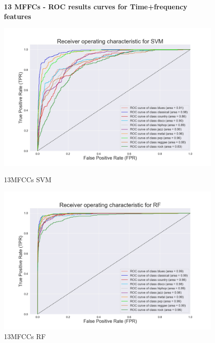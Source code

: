 \documentclass[conference]{IEEEtran}
\begin{document}
\begin{figure}[!ht]
    \begin{center}
        \small\textbf{13 MFFCs - ROC results curves for Time+frequency features}\par\medskip
        \begin{minipage}[t]{.24\textwidth}
            \centering
            \includegraphics[width=\textwidth]{plot/SL/all_features/13/SVM_13MFCC_10000_10GEN_GTZAN - ROC Plot.jpg}
            \caption{13MFCCs SVM}
            \label{fig:13MFCCs SVM Time+frequency Features}
        \end{minipage}
        \begin{minipage}[t]{.24\textwidth}
            \centering
            \includegraphics[width=\textwidth]{plot/SL/all_features/13/RF_13MFCC_10000_10GEN_GTZAN - ROC Plot.jpg}
            \caption{13MFCCs RF}
            \label{fig:13MFCCs RF Time+frequency Features}

\end{minipage}
\end{center}
\end{figure}
\end{document}
